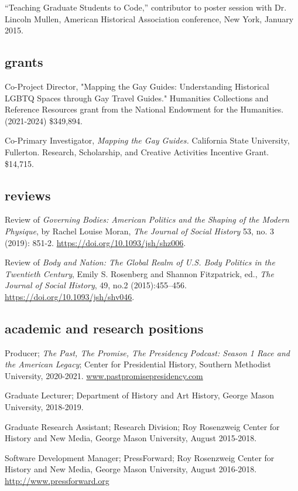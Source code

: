\documentclass[11pt]{article}
\begin{document}
``Teaching Graduate Students to Code,'' contributor to poster session with Dr. Lincoln Mullen, American Historical Association conference, New York, January 2015.

\subsection{grants}
Co-Project Director, "Mapping the Gay Guides: Understanding Historical LGBTQ Spaces through Gay Travel Guides." Humanities Collections and Reference Resources grant from the National Endowment for the Humanities. (2021-2024) \$349,894.

Co-Primary Investigator, \emph{Mapping the Gay Guides.} California State University, Fullerton. Research, Scholarship, and Creative Activities Incentive Grant. \$14,715.

\subsection{reviews}\label{reviews}

Review of \emph{Governing Bodies: American Politics and the Shaping of the Modern Physique}, by Rachel Louise Moran, \emph{The Journal of Social History} 53, no. 3 (2019): 851-2. \url{https://doi.org/10.1093/jsh/shz006}.

Review of \emph{Body and Nation: The Global Realm of U.S. Body Politics in the Twentieth Century}, Emily S. Rosenberg and Shannon Fitzpatrick, ed., \emph{The Journal of Social History}, 49, no.2 (2015):455–456. \url{https://doi.org/10.1093/jsh/shv046}.

\subsection{academic and research positions}
Producer; \emph{The Past, The Promise, The Presidency Podcast: Season 1 Race and the American Legacy}; Center for Presidential History, Southern Methodist University, 2020-2021. \url{www.pastpromisepresidency.com}

Graduate Lecturer; Department of History and Art History, George Mason University, 2018-2019.

Graduate Research Assistant; Research Division; Roy Rosenzweig Center for History and New Media, George Mason University, August 2015-2018.

Software Development Manager; PressForward; Roy Rosenzweig Center for History and New Media, George Mason University, August 2016-2018. \url{http://www.pressforward.org}
\end{document}
